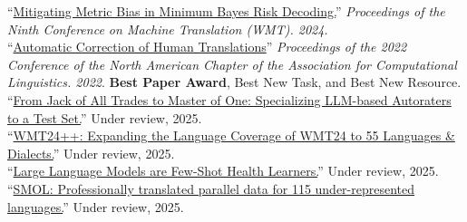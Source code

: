 
``\href{https://aclanthology.org/2024.wmt-1.109.pdf}{Mitigating Metric Bias in Minimum Bayes Risk Decoding.}'' \emph{Proceedings of the Ninth Conference on Machine Translation (WMT). 2024.}\\

``\href{https://aclanthology.org/2022.naacl-main.36.pdf}{Automatic Correction of Human Translations}'' \emph{Proceedings of the 2022 Conference of the North American Chapter of the Association for Computational Linguistics. 2022}. \textbf{Best Paper Award}, Best New Task, and Best New Resource.\\ %

``\href{https://arxiv.org/pdf/2411.15387}{From Jack of All Trades to Master of One: Specializing LLM-based Autoraters to a Test Set.}'' Under review, 2025.\\

``\href{https://arxiv.org/pdf/2502.12404}{WMT24++: Expanding the Language Coverage of WMT24 to 55 Languages \& Dialects.}'' Under review, 2025.\\

``\href{https://arxiv.org/pdf/2305.15525}{Large Language Models are Few-Shot Health Learners.}'' Under review, 2025.\\

``\href{https://arxiv.org/pdf/2502.12301}{SMOL: Professionally translated parallel data for 115 under-represented languages.}'' Under review, 2025.\\

